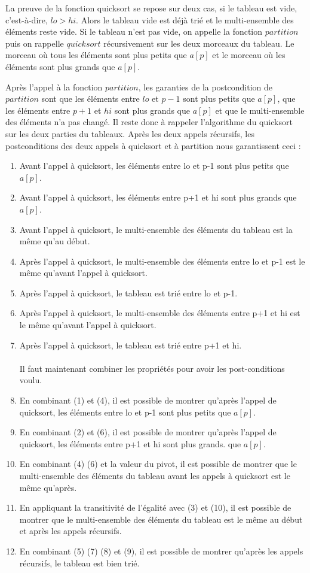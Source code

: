 \documentclass[11pt,openany]{article}
\begin{document}
		La preuve de la fonction quicksort se repose sur deux cas, si le tableau est vide, c'est-\`a-dire, $lo > hi$. Alors le tableau vide est d\'ej\`a tri\'e et le multi-ensemble des \'el\'ements reste vide. Si le tableau n'est pas vide, on appelle la fonction $partition$ puis on rappelle $quicksort$ r\'ecursivement sur les deux morceaux du tableau. Le morceau o\`u tous les \'el\'ements sont plus petits que $a[p]$ et le morceau o\`u les \'el\'ements sont plus grands que $a[p]$.
		
		Apr\`es l'appel \`a la fonction $partition$, les garanties de la postcondition de $partition$ sont que les \'el\'ements entre $lo$ et $p-1$ sont plus petits que $a[p]$, que les \'el\'ements entre $p+1$ et $hi$ sont plus grands que $a[p]$ et que le multi-ensemble des \'el\'ements n'a pas chang\'e. Il reste donc \`a rappeler l'algorithme du quicksort sur les deux parties du tableaux. Apr\`es les deux appels r\'ecursifs, les postconditions des deux appels \`a quicksort et \`a partition nous garantissent ceci :
		\begin{enumerate}
			\item Avant l'appel \`a quicksort, les \'el\'ements entre lo et p-1 sont plus petits que $a[p]$.
			\item Avant l'appel \`a quicksort, les \'el\'ements entre p+1 et hi sont plus grands que $a[p]$.
			\item Avant l'appel \`a quicksort, le multi-ensemble des \'el\'ements du tableau est la m\^eme qu'au d\'ebut.
			\item Apr\`es l'appel \`a quicksort, le multi-ensemble des \'el\'ements entre lo et p-1 est le m\^eme qu'avant l'appel \`a quicksort.
			\item Apr\`es l'appel \`a quicksort, le tableau est tri\'e entre lo et p-1.
			\item Apr\`es l'appel \`a quicksort, le multi-ensemble des \'el\'ements entre p+1 et hi est le m\^eme qu'avant l'appel \`a quicksort.
			\item Apr\`es l'appel \`a quicksort, le tableau est tri\'e entre p+1 et hi.\\ \\
			Il faut maintenant combiner les propri\'et\'es pour avoir les post-conditions voulu.
			\item En combinant (1) et (4), il est possible de montrer qu'apr\`es l'appel de quicksort, les \'el\'ements entre lo et p-1 sont plus petits que $a[p]$.
			\item En combinant (2) et (6), il est possible de montrer qu'apr\`es l'appel de quicksort, les \'el\'ements entre p+1 et hi sont plus grands. que $a[p]$.
			\item En combinant (4) (6) et la valeur du pivot, il est possible de montrer que le multi-ensemble des \'el\'ements du tableau avant les appels \`a quicksort est le m\^eme qu'apr\`es.
			\item En appliquant la transitivit\'e de l'\'egalit\'e avec (3) et (10), il est possible de montrer que le multi-ensemble des \'el\'ements du tableau est le m\^eme au d\'ebut et apr\`es les appels r\'ecursifs.
			\item En combinant (5) (7) (8) et (9), il est possible de montrer qu'apr\`es les appels r\'ecursifs, le tableau est bien tri\'e.
		\end{enumerate}
\end{document}
